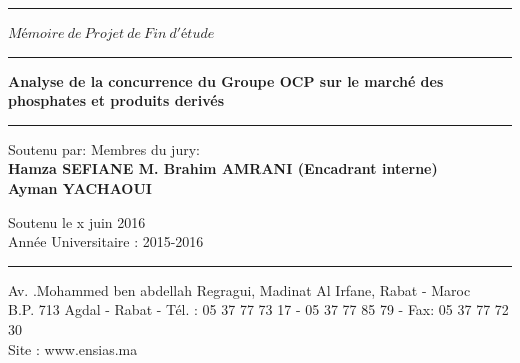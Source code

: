 \begin{titlepage}
\begin{center}
	\rule{\linewidth}{1pt}
	
	\vspace{4.65cm}
	
	\huge $Mémoire \ de \ Projet \ de \ Fin \ d'étude$
	
	\vspace{1.5cm} 
	
	\rule{\linewidth}{2pt}
	
	\Large
	\textbf{Analyse de la concurrence du Groupe OCP sur le marché des phosphates et produits derivés}
	
	\rule{\linewidth}{2pt}
	
	\vspace{1.5cm}
	
	\begin{flushleft}
	
	\normalsize{Soutenu par:} \hfill Membres du jury: \\
	\vspace{10pt}
	\textbf{Hamza SEFIANE \hfill M. Brahim AMRANI (Encadrant interne)} \\
	\textbf{Ayman YACHAOUI \hfill}
	
	\end{flushleft}
	
	\begin{center}
	
			\vspace{74pt}
			\normalsize{Soutenu le x juin 2016} \\
			\vspace{39pt}
			Année Universitaire : 2015-2016
			\vspace{6pt}
			
			\rule{\linewidth}{1pt}
			\footnotesize Av. .Mohammed ben abdellah Regragui, Madinat Al Irfane, Rabat - Maroc\\
			B.P. 713 Agdal - Rabat - Tél. : 05 37 77 73 17 - 05 37 77 85 79 - Fax: 05 37 77 72 30\\
			Site : www.ensias.ma 
	
	\end{center}
	
\end{center}

\end{titlepage}
